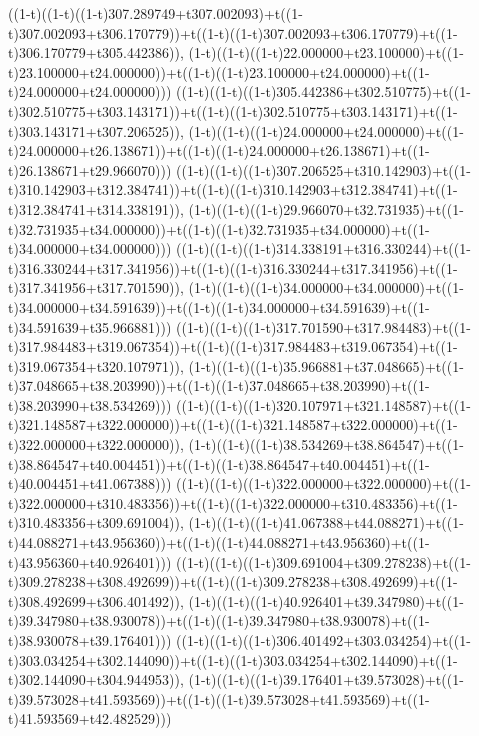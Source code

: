 ((1-t)((1-t)((1-t)307.289749+t307.002093)+t((1-t)307.002093+t306.170779))+t((1-t)((1-t)307.002093+t306.170779)+t((1-t)306.170779+t305.442386)),                                     (1-t)((1-t)((1-t)22.000000+t23.100000)+t((1-t)23.100000+t24.000000))+t((1-t)((1-t)23.100000+t24.000000)+t((1-t)24.000000+t24.000000)))
((1-t)((1-t)((1-t)305.442386+t302.510775)+t((1-t)302.510775+t303.143171))+t((1-t)((1-t)302.510775+t303.143171)+t((1-t)303.143171+t307.206525)),                                     (1-t)((1-t)((1-t)24.000000+t24.000000)+t((1-t)24.000000+t26.138671))+t((1-t)((1-t)24.000000+t26.138671)+t((1-t)26.138671+t29.966070)))
((1-t)((1-t)((1-t)307.206525+t310.142903)+t((1-t)310.142903+t312.384741))+t((1-t)((1-t)310.142903+t312.384741)+t((1-t)312.384741+t314.338191)),                                     (1-t)((1-t)((1-t)29.966070+t32.731935)+t((1-t)32.731935+t34.000000))+t((1-t)((1-t)32.731935+t34.000000)+t((1-t)34.000000+t34.000000)))
((1-t)((1-t)((1-t)314.338191+t316.330244)+t((1-t)316.330244+t317.341956))+t((1-t)((1-t)316.330244+t317.341956)+t((1-t)317.341956+t317.701590)),                                     (1-t)((1-t)((1-t)34.000000+t34.000000)+t((1-t)34.000000+t34.591639))+t((1-t)((1-t)34.000000+t34.591639)+t((1-t)34.591639+t35.966881)))
((1-t)((1-t)((1-t)317.701590+t317.984483)+t((1-t)317.984483+t319.067354))+t((1-t)((1-t)317.984483+t319.067354)+t((1-t)319.067354+t320.107971)),                                     (1-t)((1-t)((1-t)35.966881+t37.048665)+t((1-t)37.048665+t38.203990))+t((1-t)((1-t)37.048665+t38.203990)+t((1-t)38.203990+t38.534269)))
((1-t)((1-t)((1-t)320.107971+t321.148587)+t((1-t)321.148587+t322.000000))+t((1-t)((1-t)321.148587+t322.000000)+t((1-t)322.000000+t322.000000)),                                     (1-t)((1-t)((1-t)38.534269+t38.864547)+t((1-t)38.864547+t40.004451))+t((1-t)((1-t)38.864547+t40.004451)+t((1-t)40.004451+t41.067388)))
((1-t)((1-t)((1-t)322.000000+t322.000000)+t((1-t)322.000000+t310.483356))+t((1-t)((1-t)322.000000+t310.483356)+t((1-t)310.483356+t309.691004)),                                     (1-t)((1-t)((1-t)41.067388+t44.088271)+t((1-t)44.088271+t43.956360))+t((1-t)((1-t)44.088271+t43.956360)+t((1-t)43.956360+t40.926401)))
((1-t)((1-t)((1-t)309.691004+t309.278238)+t((1-t)309.278238+t308.492699))+t((1-t)((1-t)309.278238+t308.492699)+t((1-t)308.492699+t306.401492)),                                     (1-t)((1-t)((1-t)40.926401+t39.347980)+t((1-t)39.347980+t38.930078))+t((1-t)((1-t)39.347980+t38.930078)+t((1-t)38.930078+t39.176401)))
((1-t)((1-t)((1-t)306.401492+t303.034254)+t((1-t)303.034254+t302.144090))+t((1-t)((1-t)303.034254+t302.144090)+t((1-t)302.144090+t304.944953)),                                     (1-t)((1-t)((1-t)39.176401+t39.573028)+t((1-t)39.573028+t41.593569))+t((1-t)((1-t)39.573028+t41.593569)+t((1-t)41.593569+t42.482529)))

